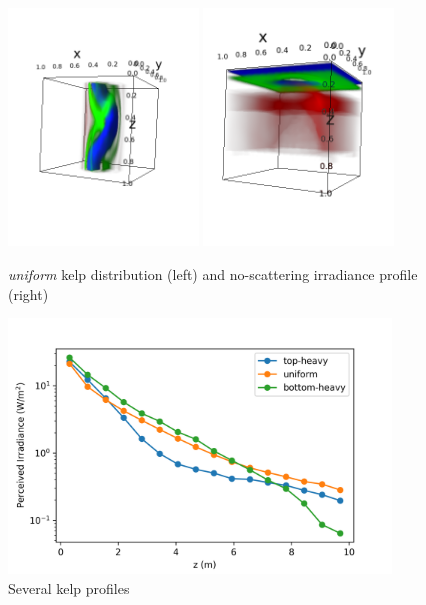 \documentclass[ms,cpyr,lof,lot]{uathesis}
\begin{document}
\begin{figure}[H]
  \centering
  \vspace{-3em}
  \includegraphics[width=0.45\textwidth]{uniform_kelp}
  \includegraphics[width=0.45\textwidth]{uniform_irrad}
  \caption{\textit{uniform} kelp distribution (left) and no-scattering irradiance profile (right)}
\end{figure}

\begin{figure}[H]
  \centering
  \includegraphics[width=4in]{sens_analysis_kelp_profile}
  \caption{Several kelp profiles}
\end{figure}
\end{document}
